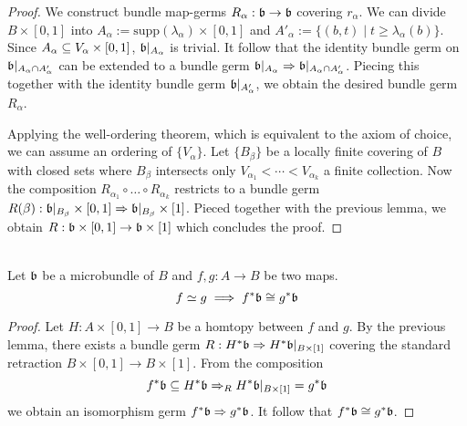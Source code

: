 \begin{file}
\begin{proof}
We construct bundle map-germs $R_\alpha: \bb \to \bb$ covering $r_\alpha$.
We can divide $B \times [0, 1]$ into $A_\alpha := \text{supp}(\lambda_\alpha) \times [0, 1]$ and $A'_\alpha := \{(b, t) \mid t \ge \lambda_\alpha(b)\}$.
Since $A_\alpha \sub V_\alpha \times [0, 1]$, $\bb\restr{A_\alpha}$ is trivial.
It follow that the identity bundle germ on $\bb\restr{\A \cap \A[']}$ can be extended to a bundle germ $\bb\restr{\A} \double \bb\restr{\A \cap \A[']}$.
Piecing this together with the identity bundle germ $\bb\restr{\A[']}$, we obtain the desired bundle germ $R_\alpha$.

Applying the well-ordering theorem, which is equivalent to the axiom of choice, we can assume an ordering of $\{ V_\alpha \}$.
Let $\{B_\beta\}$ be a locally finite covering of $B$ with closed sets where $B_\beta$ intersects only $V_{\alpha_1} < \cdots < V_{\alpha_k}$ a finite collection.
Now the composition $R_{\alpha_1} \circ \ldots \circ R_{\alpha_k}$ restricts to a bundle germ $R(\beta): \bb\restr{B_\beta} \times [0, 1] \double \bb\restr{B_\beta} \times [1]$.
Pieced together with the previous lemma, we obtain $R: \bb \times [0, 1]\to \bb \times [1]$ which concludes the proof.
\end{proof}

 \\
Let $\bb$ be a microbundle of $B$ and $f, g: A \to B$ be two maps.
\[ f \simeq g \implies f^*\bb \cong g^*\bb \]
\begin{proof}
Let $H: A \times [0, 1] \to B$ be a homtopy between $f$ and $g$.
By the previous lemma, there exists a bundle germ $R: H^*\bb \double H^*\bb\restr{B \times [1]}$ covering the standard retraction $B \times [0, 1] \to B \times [1]$.
From the composition
\[ f^*\bb \sub H^*\bb \double_R H^*\bb\restr{B \times [1]} = g^*\bb \]
we obtain an isomorphism germ $f^*\bb \double g^*\bb$.
It follow that $f^*\bb \cong g^*\bb$.
\end{proof}

\end{file}